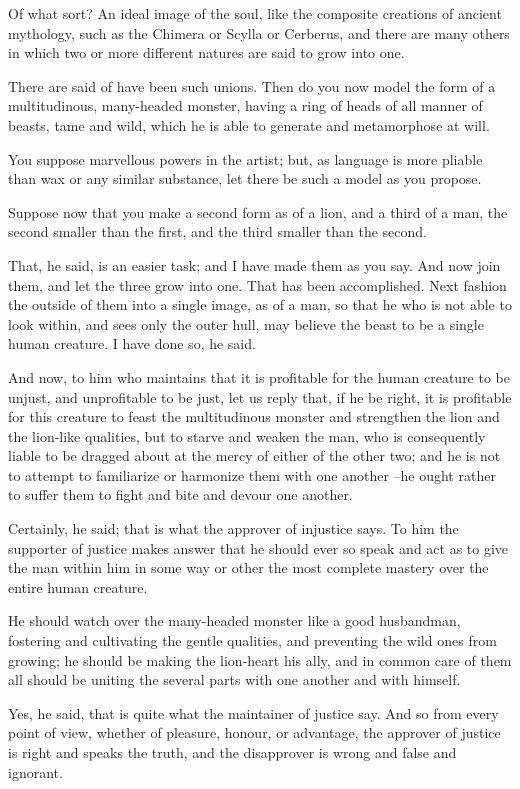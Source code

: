 Of what sort?
An ideal image of the soul, like the composite creations of ancient mythology, such as the Chimera or Scylla or Cerberus, and there are many others in which two or more different natures are said to grow into one.

There are said of have been such unions.
Then do you now model the form of a multitudinous, many-headed monster, having a ring of heads of all manner of beasts, tame and wild, which he is able to generate and metamorphose at will.

You suppose marvellous powers in the artist; but, as language is more pliable than wax or any similar substance, let there be such a model as you propose.

Suppose now that you make a second form as of a lion, and a third of a man, the second smaller than the first, and the third smaller than the second.

That, he said, is an easier task; and I have made them as you say.
And now join them, and let the three grow into one.
That has been accomplished.
Next fashion the outside of them into a single image, as of a man, so that he who is not able to look within, and sees only the outer hull, may believe the beast to be a single human creature. I have done so, he said.

And now, to him who maintains that it is profitable for the human creature to be unjust, and unprofitable to be just, let us reply that, if he be right, it is profitable for this creature to feast the multitudinous monster and strengthen the lion and the lion-like qualities, but to starve and weaken the man, who is consequently liable to be dragged about at the mercy of either of the other two; and he is not to attempt to familiarize or harmonize them with one another --he ought rather to suffer them to fight and bite and devour one another.

Certainly, he said; that is what the approver of injustice says.
To him the supporter of justice makes answer that he should ever so speak and act as to give the man within him in some way or other the most complete mastery over the entire human creature.

He should watch over the many-headed monster like a good husbandman, fostering and cultivating the gentle qualities, and preventing the wild ones from growing; he should be making the lion-heart his ally, and in common care of them all should be uniting the several parts with one another and with himself.

Yes, he said, that is quite what the maintainer of justice say.
And so from every point of view, whether of pleasure, honour, or advantage, the approver of justice is right and speaks the truth, and the disapprover is wrong and false and ignorant.

